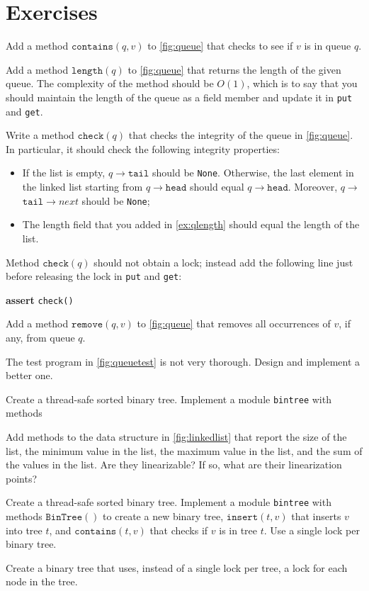 \documentclass{report}
\newenvironment{code}{
\tcolorbox
}{
\endtcolorbox
}
\begin{document}
\section*{Exercises}
\begin{problems}
\item \label{ex:qcontains} Add a method $\mathtt{contains}(q, v)$ to \autoref{fig:queue}
that checks to see if $v$ is in queue $q$.
\item Add a method $\mathtt{length}(q)$ to \autoref{fig:queue} that returns the length of the given queue.
The complexity of the method should be $O(1)$, which is to say that you should maintain
the length of the queue as a field member and update it in \texttt{put} and \texttt{get}.
\item \label{ex:qlength} Write a method $\mathtt{check}(q)$
that checks the integrity of the queue in \autoref{fig:queue}.
In particular, it should check the following integrity properties:
\begin{itemize}
\item If the list is empty, $q$$\rightarrow$$\mathtt{tail}$ should be \texttt{None}.
Otherwise, the last element in the linked list starting from $q$$\rightarrow$$\mathtt{head}$
should equal $q$$\rightarrow$$\mathtt{head}$. Moreover,
$q$$\rightarrow$$\texttt{tail}$$\rightarrow$$next$ should be \texttt{None};
\item The length field that you added in \autoref{ex:qlength} should equal the length
of the list.
\end{itemize}
Method $\mathtt{check}(q)$ should not obtain a lock; instead add the following line
just before releasing the lock in \texttt{put} and \texttt{get}:
\begin{code}
\textbf{assert} \texttt{check()}
\end{code}
\item Add a method $\mathtt{remove}(q, v)$ to \autoref{fig:queue}
that removes all occurrences of $v$, if any, from queue $q$.
\item The test program in \autoref{fig:queuetest} is not very thorough.  Design
and implement a better one.
\item Create a thread-safe sorted binary tree.  Implement a module
\texttt{bintree} with methods
\item Add methods to the data structure in \autoref{fig:linkedlist}
that report the size of the list, the minimum value in the
list, the maximum value in the list, and the sum of the values in the list.
Are they linearizable?  If so, what are their linearization points?
\item Create a thread-safe sorted binary tree.  Implement a module \texttt{bintree}
with methods
$\mathtt{BinTree}()$ to create a new binary tree, $\mathtt{insert}(t, v)$ that inserts $v$ into
tree $t$, and $\mathtt{contains}(t, v)$ that checks if $v$ is in tree $t$.  Use a single
lock per binary tree.
\item Create a binary tree that uses, instead of a single lock per tree,
a lock for each node in the tree.
\end{problems}
\end{document}
